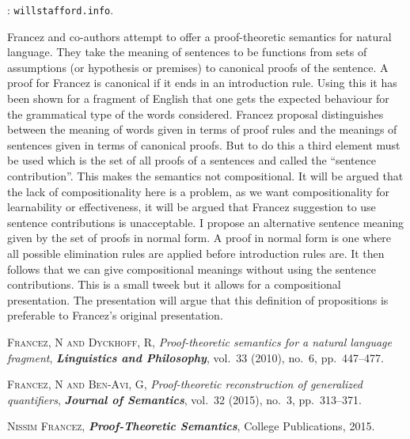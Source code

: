 \documentclass[bsl,meeting]{asl}
\def\urladdr#1{\endgraf\noindent{\it URL Address}: {\tt #1}.}
\newcommand{\NP}{}
\begin{document}
\thispagestyle{empty}


\NP  
{}
\urladdr{willstafford.info}

Francez and co-authors \cite{Francez2010-fb,Francez2014-md,Francez2015} attempt to offer a proof-theoretic semantics for natural language.  They take the meaning of sentences to be functions from sets of assumptions (or hypothesis or premises) to canonical proofs of the sentence. A proof for Francez is canonical if it ends in an introduction rule. Using this it has been shown for a fragment of English that one gets the expected behaviour for the grammatical type of the words considered. Francez proposal distinguishes between the meaning of words given in terms of proof rules and the meanings of sentences given in terms of canonical proofs. But to do this a third element must be used which is the set of all proofs of a sentences and called the “sentence contribution”.  This makes the semantics not compositional. It will be argued that the lack of compositionality here is a problem, as we want compositionality for learnability or effectiveness, it will be argued that Francez suggestion to use sentence contributions is unacceptable. I propose an alternative sentence meaning given by the set of proofs in normal form. A proof in normal form is one where all possible elimination rules are applied before introduction rules are.  It then follows that we can give compositional meanings without using the sentence contributions.  This is a small tweek but it allows for a compositional presentation.  The presentation will argue that this definition of propositions is preferable to Francez's original presentation.  

\begin{thebibliography}{10}

{\scshape Francez, N and Dyckhoff, R},
{\itshape Proof-theoretic semantics for a natural language fragment},
{\bfseries\itshape Linguistics and Philosophy},
vol.~33 (2010), no.~6, pp.~447--477.

{\scshape Francez, N and Ben-Avi, G},
{\itshape Proof-theoretic reconstruction of generalized quantifiers},
{\bfseries\itshape Journal of Semantics},
vol.~32 (2015), no.~3, pp.~313--371.

{\scshape Nissim Francez},
{\bfseries\itshape Proof-Theoretic Semantics},
College Publications,
2015.

\end{thebibliography}


\vspace*{-0.5\baselineskip}
\end{document}
